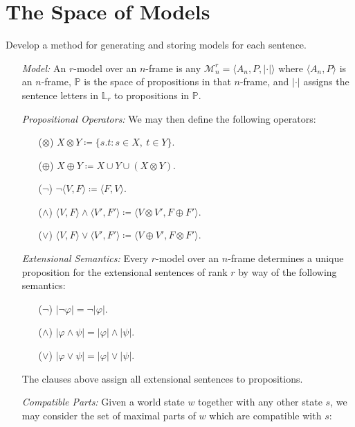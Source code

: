 \documentclass[a4paper, 11pt]{article} %
\newcommand{\tuple}[1]{\langle#1\rangle} %
\newcommand{\set}[1]{\lbrace#1\rbrace} %
\renewcommand{\P}[0]{\mathbb{P}}
\renewcommand{\L}[0]{\mathbb{L}}
\newcommand{\M}[0]{\mathcal{M}}
\renewcommand{\vert}[1]{\lvert#1\rvert}
\begin{document}
\section{The Space of Models}

Develop a method for generating and storing models for each sentence.

\begin{enumerate}
  \item[\it Model:] An $r$-model over an $n$-frame is any $\M^r_n=\tuple{A_n,P,\vert{\cdot}}$ where $\tuple{A_n,P}$ is an $n$-frame, $\P$ is the space of propositions in that $n$-frame, and $\vert{\cdot}$ assigns the sentence letters in $\L_r$ to propositions in $\P$.
  \item[\it Propositional Operators:] We may then define the following operators:
    \begin{itemize}
      \item[($\otimes$)] $X \otimes Y \coloneq \set{s.t : s \in X,\ t \in Y}$.
      \item[($\oplus$)] $X \oplus Y \coloneq X \cup Y \cup (X \otimes Y)$.
      \item[($\neg$)] $\neg\tuple{V,F} \coloneq \tuple{F,V}$.
      \item[($\wedge$)] $\tuple{V,F}\wedge\tuple{V',F'} \coloneq \tuple{V\otimes V',F\oplus F'}$.
      \item[($\vee$)] $\tuple{V,F}\vee\tuple{V',F'} \coloneq \tuple{V\oplus V',F\otimes F'}$.
    \end{itemize}
  \item[\it Extensional Semantics:] Every $r$-model over an $n$-frame determines a unique proposition for the extensional sentences of rank $r$ by way of the following semantics: 
    \begin{itemize}
      \item[($\neg$)] $\vert{\neg\varphi}=\neg\vert{\varphi}$.
      \item[($\wedge$)] $\vert{\varphi\wedge\psi}=\vert{\varphi}\wedge\vert{\psi}$.
      \item[($\vee$)] $\vert{\varphi\vee\psi}=\vert{\varphi}\vee\vert{\psi}$.
    \end{itemize}
    The clauses above assign all extensional sentences to propositions.
  \item[\it Compatible Parts:] Given a world state $w$ together with any other state $s$, we may consider the set of maximal parts of $w$ which are compatible with $s$:\\ 

\end{enumerate}
\end{document}
